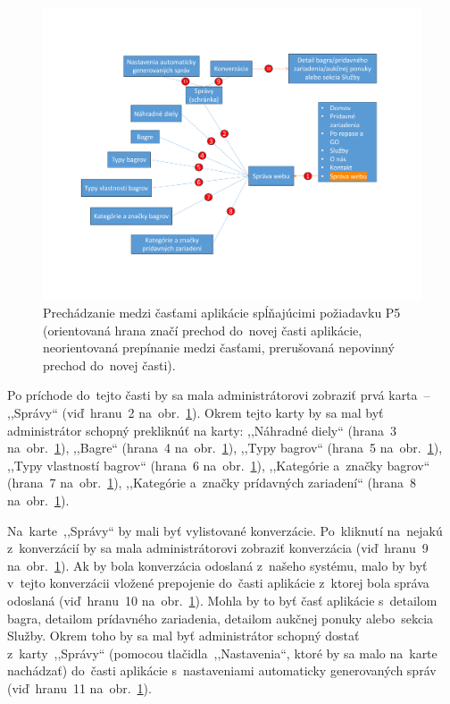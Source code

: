 \begin{figure}[H]\centering
\includegraphics[width=140mm]{../img/UI concept/p5 p7 a sprava predmetov graph}
\caption{Prechádzanie medzi časťami aplikácie spĺňajúcimi požiadavku P5 (orientovaná hrana značí prechod do~novej časti aplikácie, neorientovaná prepínanie medzi časťami, prerušovaná nepovinný prechod do~novej časti).}
\label{p5 p7 a sprava predmetov graph}
\end{figure}

Po príchode do~tejto časti by sa mala administrátorovi zobraziť prvá karta~-- ,,Správy`` (viď~hranu~2 na~obr.~\ref{p5 p7 a sprava predmetov graph}). Okrem tejto karty by sa mal byť administrátor schopný prekliknúť na karty: ,,Náhradné diely`` (hrana~3 na~obr.~\ref{p5 p7 a sprava predmetov graph}), ,,Bagre`` (hrana~4 na~obr.~\ref{p5 p7 a sprava predmetov graph}), ,,Typy bagrov`` (hrana~5 na~obr.~\ref{p5 p7 a sprava predmetov graph}), ,,Typy vlastností bagrov`` (hrana~6 na~obr.~\ref{p5 p7 a sprava predmetov graph}), ,,Kategórie a~značky bagrov`` (hrana~7 na~obr.~\ref{p5 p7 a sprava predmetov graph}), ,,Kategórie a~značky prídavných zariadení`` (hrana~8 na~obr.~\ref{p5 p7 a sprava predmetov graph}).

Na~karte~,,Správy`` by mali byť vylistované konverzácie. Po~kliknutí na~nejakú z~konverzácií by sa mala administrátorovi zobraziť konverzácia (viď~hranu~9 na~obr.~\ref{p5 p7 a sprava predmetov graph}). Ak by bola konverzácia odoslaná z~našeho systému, malo by byť v~tejto konverzácii vložené prepojenie do~časti aplikácie z~ktorej bola správa odoslaná (viď~hranu~10 na~obr.~\ref{p5 p7 a sprava predmetov graph}). Mohla by to byť časť aplikácie s~detailom bagra, detailom prídavného zariadenia, detailom aukčnej ponuky alebo~sekcia Služby. Okrem toho by sa mal byť administrátor schopný dostať z~karty~,,Správy`` (pomocou tlačidla~,,Nastavenia``, ktoré by sa malo na~karte nachádzať) do~časti aplikácie s~nastaveniami automaticky generovaných správ (viď~hranu~11 na~obr.~\ref{p5 p7 a sprava predmetov graph}).
\newpage

